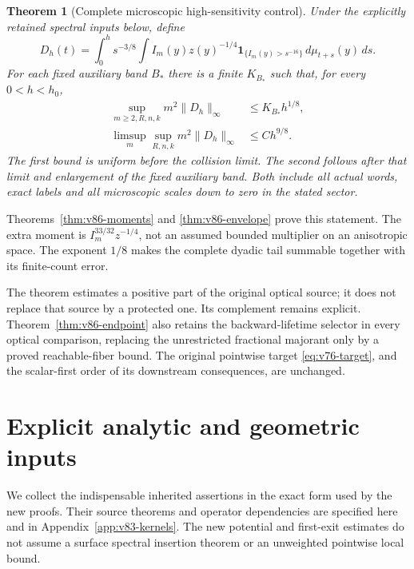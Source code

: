 \documentclass[11pt,reqno]{amsart}
\numberwithin{equation}{section}
\newtheorem{theorem}{Theorem}[section]
\theoremstyle{definition}
\theoremstyle{remark}\newtheorem{remark}[theorem]{Remark}
\newcommand{\one}{\mathbf1}\newcommand{\dd}{\,\mathrm d}
\begin{document}
\begin{theorem}[Complete microscopic high-sensitivity control]
\label{thm:v86-main}
Under the explicitly retained spectral inputs below, define
\[
 D_h(t)=\int_0^h s^{-3/8}\int I_m(y)z(y)^{-1/4}
                     \one_{\{I_m(y)>s^{-16}\}}\,d\mu_{t+s}(y)\,ds.
\]
For each fixed auxiliary band $B_*$ there is a finite $K_{B_*}$ such
that, for every $0<h<h_0$,
\begin{align}
 \sup_{m\ge2,R,n,k}m^2\|D_h\|_\infty&\le K_{B_*}h^{1/8},
                                          \label{eq:v86-main-uniform}\\
 \limsup_m\sup_{R,n,k}m^2\|D_h\|_\infty&\le Ch^{9/8}.
                                          \label{eq:v86-main-ordered}
\end{align}
The first bound is uniform before the collision limit. The second
follows after that limit and enlargement of the fixed auxiliary band.
Both include all actual words, exact labels and all microscopic
scales down to zero in the stated sector.
\end{theorem}
Theorems~\ref{thm:v86-moments} and \ref{thm:v86-envelope} prove this
statement. The extra moment is $I_m^{33/32}z^{-1/4}$, not an assumed
bounded multiplier on an anisotropic space. The exponent $1/8$ makes
the complete dyadic tail summable together with its finite-count error.

The theorem estimates a positive part of the original optical source;
it does not replace that source by a protected one. Its complement
remains explicit. Theorem~\ref{thm:v86-endpoint} also retains the
backward-lifetime selector in every optical comparison, replacing the
unrestricted fractional majorant only by a proved reachable-fiber
bound. The original pointwise target \eqref{eq:v76-target}, and the
scalar-first order of its downstream consequences, are unchanged.

\section{Explicit analytic and geometric inputs}
We collect the indispensable inherited assertions in the exact form
used by the new proofs. Their source theorems and operator dependencies
are specified here and in Appendix~\ref{app:v83-kernels}. The new
potential and first-exit estimates do not assume a surface spectral
insertion theorem or an unweighted pointwise local bound.
\end{document}
